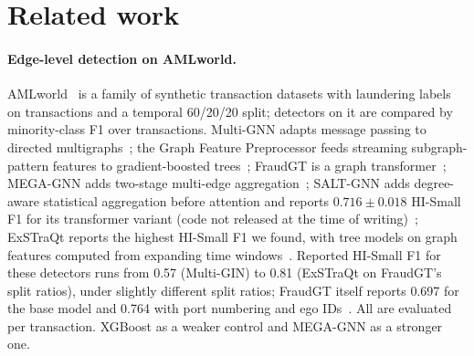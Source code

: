 \section{Related work}
\label{sec:related}

\paragraph{Edge-level detection on AMLworld.}
AMLworld~\citep{altman2023} is a family of synthetic transaction datasets with laundering
labels on transactions and a temporal 60/20/20 split; detectors on it are compared by
minority-class F1 over transactions. Multi-GNN adapts message passing to directed
multigraphs~\citep{egressy2024}; the Graph Feature Preprocessor feeds streaming subgraph-pattern
features to gradient-boosted trees~\citep{blanusa2024}; FraudGT is a graph
transformer~\citep{lin2024fraudgt}; MEGA-GNN adds two-stage multi-edge
aggregation~\citep{bilgi2024}; SALT-GNN adds degree-aware statistical aggregation before
attention and reports $0.716 \pm 0.018$ HI-Small F1 for its transformer variant (code not
released at the time of writing)~\citep{losavio2026salt}; ExSTraQt reports the highest HI-Small
F1 we found, with tree models on graph features computed from expanding time
windows~\citep{tariq2026exstraqt}. Reported HI-Small F1 for these detectors runs from 0.57
(Multi-GIN) to 0.81 (ExSTraQt on FraudGT's split ratios), under slightly different split ratios;
FraudGT itself reports 0.697 for the base model and 0.764 with port numbering and ego
IDs~\citep{lin2024fraudgt}. All are evaluated per transaction.
XGBoost as a weaker control and MEGA-GNN as a stronger one.

